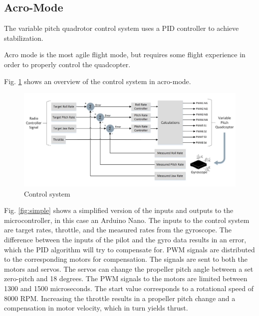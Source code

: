 \subsection{Acro-Mode}

The variable pitch quadrotor control system uses a PID controller to achieve stabilization. 

Acro mode is the most agile flight mode, but requires some flight experience in order to properly control the quadcopter.\bigskip


Fig. \ref{fig:micro} shows an overview of the control system in acro-mode. 



\begin{figure}[H]
          \centering
            \includegraphics[scale = 0.55]{VAPIQ-PICTURES/controldrawing}
            \caption{Control system}
            \label{fig:micro}
\end{figure} 


Fig. \ref{fig:simple} shows a simplified version of the inputs and outputs to the microcontroller, in this case an Arduino Nano. The inputs to the control system are target rates, throttle, and the measured rates from the gyroscope. The difference between the inputs of the pilot and the gyro data results in an error, which the PID algorithm will try to compensate for. PWM signals are distributed to the corresponding motors for compensation. The signals are sent to both the motors and servos. The servos can change the propeller pitch angle between a set zero-pitch and 18 degrees. The PWM signals to the motors are limited between 1300 and 1500 microseconds. The start value corresponds to a rotational speed of 8000 RPM. Increasing the throttle results in a propeller pitch change and a compensation in motor velocity, which in turn yields thrust. 

